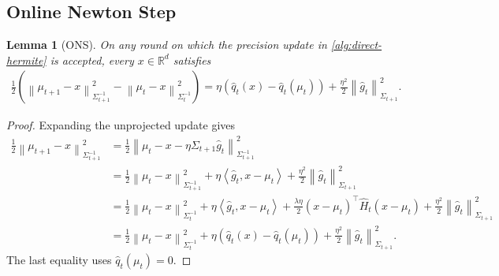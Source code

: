 \documentclass[11pt]{article}
\newtheorem{lemma}[lemma]{Lemma}
\newcommand{\R}{\mathbb R}
\newcommand{\1}{\mathbf 1}
\newcommand{\ip}[2]{\left\langle #1,#2\right\rangle}
\newcommand{\normm}[2]{\left\lVert #1\right\rVert_{#2}}
\begin{document}
\subsection{Online Newton Step}
\begin{lemma}[ONS]
    \label{lem:ons-step}
    On any round on which the precision update in
    \cref{alg:direct-hermite} is accepted, every $x\in\R^d$ satisfies
    \begin{align}
        \frac12
        \left(\normm{\mu_{t+1}-x}{\Sigma_{t+1}^{-1}}^2
        -\normm{\mu_t-x}{\Sigma_t^{-1}}^2\right)
        =
        \eta\left(
        \widehat q_t(x)-\widehat q_t(\mu_t)
        \right)
        +\frac{\eta^2}{2}\normm{\widehat g_t}{\Sigma_{t+1}}^2.
        \label{eq:ons-step}
    \end{align}
\end{lemma}
\begin{proof}
    Expanding the unprojected update gives
    \begin{align}
        \frac12\normm{\mu_{t+1}-x}{\Sigma_{t+1}^{-1}}^2
         & =
        \frac12\normm{\mu_t-x-\eta\Sigma_{t+1}\widehat g_t}
        {\Sigma_{t+1}^{-1}}^2
        \\
         & =
        \frac12\normm{\mu_t-x}{\Sigma_{t+1}^{-1}}^2
        +\eta\ip{\widehat g_t}{x-\mu_t}
        +\frac{\eta^2}{2}\normm{\widehat g_t}{\Sigma_{t+1}}^2
        \\
         & =
        \frac12\normm{\mu_t-x}{\Sigma_t^{-1}}^2
        +\eta\ip{\widehat g_t}{x-\mu_t}
        +\frac{\lambda\eta}{2}(x-\mu_t)^\top\widehat H_t(x-\mu_t)
        +\frac{\eta^2}{2}\normm{\widehat g_t}{\Sigma_{t+1}}^2
        \\
         & =
        \frac12\normm{\mu_t-x}{\Sigma_t^{-1}}^2
        +\eta\left(\widehat q_t(x)-\widehat q_t(\mu_t)\right)
        +\frac{\eta^2}{2}\normm{\widehat g_t}{\Sigma_{t+1}}^2.
    \end{align}
    The last equality uses $\widehat q_t(\mu_t)=0$.
\end{proof}
\end{document}
